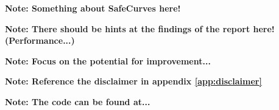 \textbf{Note: Something about SafeCurves here!}

\textbf{Note: There should be hints at the findings of the report here! (Performance...)}

\textbf{Note: Focus on the potential for improvement...}

\textbf{Note: Reference the disclaimer in appendix \ref{app:disclaimer}}

\textbf{Note: The code can be found at...}